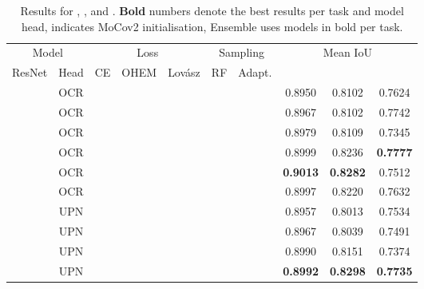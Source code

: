 \documentclass[runningheads]{llncs}
\newcommand{\mc}[1]{\multicolumn{1}{c}{#1}}
\newcommand{\upr}{UPN}
\newcommand{\lov}{Lov\'{a}sz}
\newcommand{\tbf}[1]{\textbf{#1}}
\newcommand{\tick}{\checkmark}
\newcommand{\ta}[1]{\textbf{}}
\begin{document}
\begin{table}[ht]
\setlength{\tabcolsep}{3pt}
  \centering
   \caption{Results for \ta1, \ta2, and \ta3. \tbf{Bold} numbers denote the best results per task and model head,  indicates MoCov2 initialisation, Ensemble uses models in bold per task.}
  \label{tab:results}
  \begin{tabular}{c c c c c c c c c c}
    \toprule
    \multicolumn{2}{c}{Model}        & \multicolumn{3}{c}{Loss}              & \multicolumn{2}{c}{Sampling} & \multicolumn{3}{c}{Mean IoU}  \\
    \cmidrule(r){1-2} \cmidrule(l){3-5}  \cmidrule(l){6-7} \cmidrule(l){8-10}
    ResNet     & Head                & CE           & OHEM        & \lov{}     & RF          & Adapt.     & \ta1         & \ta2         & \ta3 \\
    \mc{}  & \mc{OCR}            & \mc{\tick}   & \mc{}       & \mc{}      & \mc{\tick}  & \mc{}      & \mc{0.8950} & \mc{0.8102} & \mc{0.7624} \\ 
    \mc{}  & \mc{OCR}            & \mc{}        & \mc{\tick}  & \mc{}      & \mc{\tick}  & \mc{}      & \mc{0.8967} & \mc{0.8102} & \mc{0.7742} \\
    \mc{}  & \mc{OCR}            & \mc{}        & \mc{}       & \mc{\tick} & \mc{}       & \mc{}      & \mc{0.8979} & \mc{0.8109} & \mc{0.7345} \\
    \mc{}  & \mc{OCR}            & \mc{}        & \mc{}       & \mc{\tick} & \mc{\tick}  & \mc{}      & \mc{0.8999} & \mc{0.8236} & \mc{\tbf{0.7777}} \\
    \mc{} & \mc{OCR}   & \mc{}        & \mc{}       & \mc{\tick} & \mc{\tick}  & \mc{}      & \mc{\tbf{0.9013}} & \mc{\tbf{0.8282}} & \mc{0.7512} \\
    \mc{}      & \mc{OCR}        & \mc{}        & \mc{}       & \mc{\tick} & \mc{}       & \mc{\tick} & \mc{0.8997} & \mc{0.8220} & \mc{0.7632} \\
    \midrule
    \mc{} & \upr                 & \mc{\tick}   & \mc{}       & \mc{}      & \mc{\tick}  & \mc{}      & \mc{0.8957} & \mc{0.8013} & \mc{0.7534} \\
    \mc{} & \upr                 & \mc{}        & \mc{\tick}  & \mc{}      & \mc{\tick}  & \mc{}      & \mc{0.8967} & \mc{0.8039} & \mc{0.7491} \\
    \mc{} & \upr                 & \mc{}        & \mc{}       & \mc{\tick}      & \mc{}  & \mc{}      & \mc{0.8990} & \mc{0.8151} & \mc{0.7374} \\
    \mc{} & \upr                 & \mc{}        & \mc{}       & \mc{\tick} & \mc{\tick}  & \mc{}      & \mc{\tbf{0.8992}} & \mc{\tbf{0.8298}} & \mc{\tbf{0.7735}} \\

\end{tabular}
\end{table}
\end{document}

